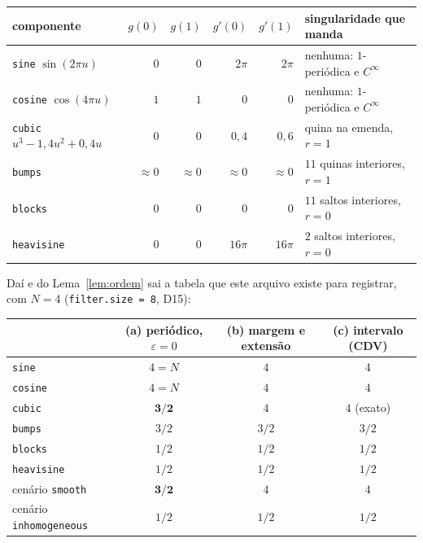 \documentclass[11pt,a4paper]{article}
\newcommand{\eps}{\varepsilon}
\begin{document}
\begin{center}
\begin{tabular}{lrrrrl}
  \toprule
  componente & $g(0)$ & $g(1)$ & $g'(0)$ & $g'(1)$ & singularidade que manda \\
  \midrule
  \texttt{sine} $\sin(2\pi u)$      & $0$ & $0$ & $2\pi$ & $2\pi$ & nenhuma: $1$-periódica e $C^{\infty}$ \\
  \texttt{cosine} $\cos(4\pi u)$    & $1$ & $1$ & $0$ & $0$ & nenhuma: $1$-periódica e $C^{\infty}$ \\
  \texttt{cubic} $u^{3}-1{,}4u^{2}+0{,}4u$ & $0$ & $0$ & $0{,}4$ & $0{,}6$ & quina na emenda, $r = 1$ \\
  \texttt{bumps}     & $\approx 0$ & $\approx 0$ & $\approx 0$ & $\approx 0$ & $11$ quinas interiores, $r = 1$ \\
  \texttt{blocks}    & $0$ & $0$ & $0$ & $0$ & $11$ saltos interiores, $r = 0$ \\
  \texttt{heavisine} & $0$ & $0$ & $16\pi$ & $16\pi$ & $2$ saltos interiores, $r = 0$ \\
  \bottomrule
\end{tabular}
\end{center}

Daí e do Lema~\ref{lem:ordem} sai a tabela que este arquivo existe para
registrar, com $N = 4$ (\texttt{filter.size = 8}, D15):

\begin{center}
\begin{tabular}{lccc}
  \toprule
  & (a) periódico, $\eps = 0$ & (b) margem e extensão & (c) intervalo (CDV) \\
  \midrule
  \texttt{sine}      & $4 = N$ & $4$ & $4$ \\
  \texttt{cosine}    & $4 = N$ & $4$ & $4$ \\
  \texttt{cubic}     & $\mathbf{3/2}$ & $4$ & $4$ (exato) \\
  \texttt{bumps}     & $3/2$ & $3/2$ & $3/2$ \\
  \texttt{blocks}    & $1/2$ & $1/2$ & $1/2$ \\
  \texttt{heavisine} & $1/2$ & $1/2$ & $1/2$ \\
  \midrule
  cenário \texttt{smooth}        & $\mathbf{3/2}$ & $4$ & $4$ \\
  cenário \texttt{inhomogeneous} & $1/2$ & $1/2$ & $1/2$ \\
  \bottomrule
\end{tabular}
\end{center}
\end{document}
